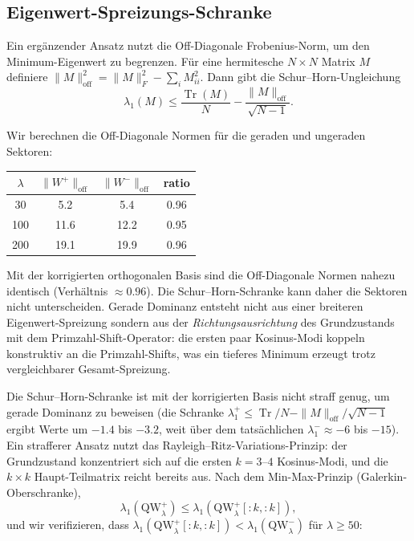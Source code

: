\documentclass[12pt,a4paper]{article}
\theoremstyle{definition}
\theoremstyle{remark}
\begin{document}
\subsection{Eigenwert-Spreizungs-Schranke}

Ein ergänzender Ansatz nutzt die Off-Diagonale Frobenius-Norm, um den Minimum-Eigenwert zu begrenzen. Für eine hermitesche $N \times N$ Matrix $M$ definiere $\|M\|_{\mathrm{off}}^2 = \|M\|_F^2 - \sum_i M_{ii}^2$. Dann gibt die Schur--Horn-Ungleichung
\[ \lambda_1(M) \leq \frac{\operatorname{Tr}(M)}{N} - \frac{\|M\|_{\mathrm{off}}}{\sqrt{N-1}}. \]

Wir berechnen die Off-Diagonale Normen für die geraden und ungeraden Sektoren:

\begin{center}
\begin{tabular}{cccc}
$\lambda$ & $\|W^+\|_{\mathrm{off}}$ & $\|W^-\|_{\mathrm{off}}$ & ratio \\
\hline
30  & 5.2 & 5.4 & 0.96 \\
100 & 11.6 & 12.2 & 0.95 \\
200 & 19.1 & 19.9 & 0.96
\end{tabular}
\end{center}

Mit der korrigierten orthogonalen Basis sind die Off-Diagonale Normen nahezu identisch (Verhältnis $\approx 0.96$). Die Schur--Horn-Schranke kann daher die Sektoren nicht unterscheiden. Gerade Dominanz entsteht nicht aus einer breiteren Eigenwert-Spreizung sondern aus der \emph{Richtungsausrichtung} des Grundzustands mit dem Primzahl-Shift-Operator: die ersten paar Kosinus-Modi koppeln konstruktiv an die Primzahl-Shifts, was ein tieferes Minimum erzeugt trotz vergleichbarer Gesamt-Spreizung.

Die Schur--Horn-Schranke ist mit der korrigierten Basis nicht straff genug, um gerade Dominanz zu beweisen (die Schranke $\lambda_1^+ \leq \operatorname{Tr}/N - \|M\|_{\mathrm{off}}/\sqrt{N-1}$ ergibt Werte um $-1.4$ bis $-3.2$, weit über dem tatsächlichen $\lambda_1^- \approx -6$ bis $-15$). Ein strafferer Ansatz nutzt das Rayleigh--Ritz-Variations-Prinzip: der Grundzustand konzentriert sich auf die ersten $k = 3$--$4$ Kosinus-Modi, und die $k \times k$ Haupt-Teilmatrix reicht bereits aus. Nach dem Min-Max-Prinzip (Galerkin-Oberschranke),
\[ \lambda_1(\mathrm{QW}_\lambda^+) \leq \lambda_1(\mathrm{QW}_\lambda^+[{:}k,{:}k]), \]
und wir verifizieren, dass $\lambda_1(\mathrm{QW}_\lambda^+[{:}k,{:}k]) < \lambda_1(\mathrm{QW}_\lambda^-)$ für $\lambda \geq 50$:
\end{document}

